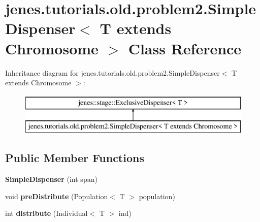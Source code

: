 \hypertarget{classjenes_1_1tutorials_1_1old_1_1problem2_1_1_simple_dispenser_3_01_t_01extends_01_chromosome_01_4}{\section{jenes.\-tutorials.\-old.\-problem2.\-Simple\-Dispenser$<$ T extends Chromosome $>$ Class Reference}
\label{classjenes_1_1tutorials_1_1old_1_1problem2_1_1_simple_dispenser_3_01_t_01extends_01_chromosome_01_4}
}
Inheritance diagram for jenes.\-tutorials.\-old.\-problem2.\-Simple\-Dispenser$<$ T extends Chromosome $>$\-:\begin{figure}[H]
\begin{center}
\leavevmode
\includegraphics[height=2.000000cm]{classjenes_1_1tutorials_1_1old_1_1problem2_1_1_simple_dispenser_3_01_t_01extends_01_chromosome_01_4}
\end{center}
\end{figure}
\subsection*{Public Member Functions}
\begin{DoxyCompactItemize}
\item 
\hypertarget{classjenes_1_1tutorials_1_1old_1_1problem2_1_1_simple_dispenser_3_01_t_01extends_01_chromosome_01_4_ad9405ac409bd21e83c50f78472835da7}{{\bfseries Simple\-Dispenser} (int span)}\label{classjenes_1_1tutorials_1_1old_1_1problem2_1_1_simple_dispenser_3_01_t_01extends_01_chromosome_01_4_ad9405ac409bd21e83c50f78472835da7}

\item 
\hypertarget{classjenes_1_1tutorials_1_1old_1_1problem2_1_1_simple_dispenser_3_01_t_01extends_01_chromosome_01_4_a428636fd68143e1c24ea22bf626c290b}{void {\bfseries pre\-Distribute} (Population$<$ T $>$ population)}\label{classjenes_1_1tutorials_1_1old_1_1problem2_1_1_simple_dispenser_3_01_t_01extends_01_chromosome_01_4_a428636fd68143e1c24ea22bf626c290b}

\item 
\hypertarget{classjenes_1_1tutorials_1_1old_1_1problem2_1_1_simple_dispenser_3_01_t_01extends_01_chromosome_01_4_a593230e918223c099f243524d3496783}{int {\bfseries distribute} (Individual$<$ T $>$ ind)}\label{classjenes_1_1tutorials_1_1old_1_1problem2_1_1_simple_dispenser_3_01_t_01extends_01_chromosome_01_4_a593230e918223c099f243524d3496783}

\end{DoxyCompactItemize}


